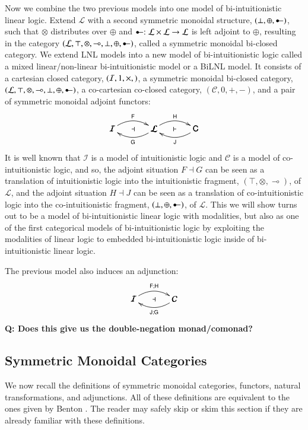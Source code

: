 \documentclass{lmcs}
\let\mto\to
\let\to\relax
\newcommand{\to}{\rightarrow}
\newcommand{\cat}[1]{\mathcal{#1}}
\newcommand{\func}[1]{\mathsf{#1}}
\newcommand{\limp}[0]{\multimap}
\newcommand{\colimp}[0]{\multimapdotinv}
\begin{document}
Now we combine the two previous models into one model of
bi-intuitionistic linear logic.  Extend $\cat{L}$ with a second
symmetric monoidal structure, $(\perp, \oplus, \colimp)$, such that
$\otimes$ distributes over $\oplus$ and $\colimp : \cat{L} \times
\cat{L} \mto \cat{L}$ is left adjoint to $\oplus$, resulting in the
category $(\cat{L}, \top, \otimes, \limp, \perp, \oplus, \colimp)$,
called a symmetric monoidal bi-closed category.  We extend LNL models
into a new model of bi-intuitionistic logic called a mixed
linear/non-linear bi-intuitionistic model or a BiLNL model.  It
consists of a cartesian closed category, $(\cat{I}, 1, \times, \to)$,
a symmetric monoidal bi-closed category, $(\cat{L}, \top,\otimes,
\limp, \perp, \oplus, \colimp)$, a co-cartesian co-closed category,
$(\cat{C}, 0,+, -)$, and a pair of symmetric monoidal adjoint
functors:
$$\bfig
\morphism(0,0)|a|/{@{>}@/^1em/}/<500,0>[\cat{I}`\cat{L};\func{F}]
\morphism(0,0)|b|/{@{<-}@/_1em/}/<500,0>[\cat{I}`\cat{L};\mathsf{G}]
\morphism(500,0)|a|/{@{>}@/^1em/}/<500,0>[\cat{L}`\func{C};\func{H}]
\morphism(500,0)|b|/{@{<-}@/_1em/}/<500,0>[\cat{L}`\func{C};\func{J}]
\place(250,0)[\dashv] \place(750,0)[\vdash] \efig$$ It is well known
that $\cat{I}$ is a model of intuitionistic logic and $\cat{C}$ is a
model of co-intuitionistic logic, and so, the adjoint situation $F
\dashv G$ can be seen as a translation of intuitionistic logic into
the intuitionistic fragment, $(\top, \otimes, \limp)$, of $\cat{L}$,
and the adjoint situation $H \dashv J$ can be seen as a translation of
co-intuitionistic logic into the co-intuitionistic fragment, $(\perp,
\oplus, \colimp)$, of $\cat{L}$.  This we will show turns out to be a
model of bi-intuitionistic linear logic with modalities, but also as
one of the first categorical models of bi-intuitionistic logic by
exploiting the modalities of linear logic to embedded
bi-intuitionistic logic inside of bi-intuitionistic linear logic.

The previous model also induces an adjunction:
$$\bfig
\morphism(0,0)|a|/{@{>}@/^1em/}/<500,0>[\cat{I}`\cat{C};\func{F};\func{H}]
\morphism(0,0)|b|/{@{<-}@/_1em/}/<500,0>[\cat{I}`\cat{C};\func{J};\func{G}]
\place(250,0)[\dashv]\efig$$
\textbf{Q: Does this give us the double-negation monad/comonad?}

\subsection{Symmetric Monoidal Categories}
\label{subsec:symmetric_monoidal_categories}
We now recall the definitions of symmetric monoidal categories,
functors, natural transformations, and adjunctions.  All of these
definitions are equivalent to the ones given by Benton
\cite{Benton:1994}.  The reader may safely skip or skim this section
if they are already familiar with these definitions.
\end{document}

